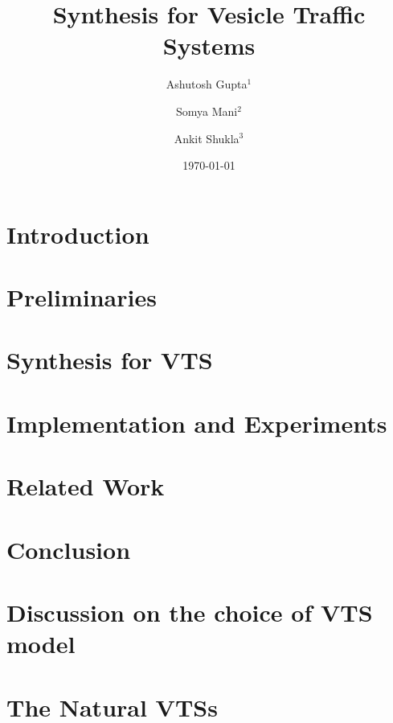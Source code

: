 \documentclass[draft]{llncs}
\begin{document}
\title{Synthesis for Vesicle Traffic Systems}

\author{Ashutosh Gupta$^1$ \and Somya Mani$^2$ \and Ankit Shukla$^3$}


\date{\today}

\maketitle

\begin{abstract}

\end{abstract}

\section{Introduction}
\label{sec:intro}


% 

\section{Preliminaries}
\label{sec:prelim}


\section{Synthesis for VTS}
\label{sec:encoding}


\section{Implementation and Experiments}
\label{sec:experiments}


\section{Related Work}
\label{sec:related}


\section{Conclusion}
\label{sec:conclusion}





\appendix
\clearpage

\section{Discussion on the choice of VTS model}
\label{sec:model}


\section{The Natural VTSs}
\label{sec:ex-vts}

\end{document}
